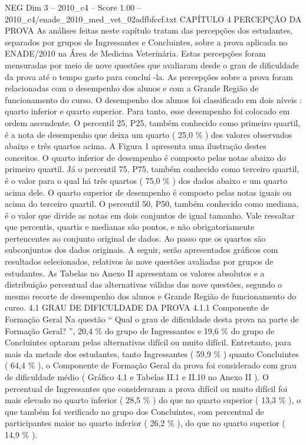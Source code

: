 \begin{textsample}{NEG Dim 3 – 2010\_c4 – Score 1.00 – 2010\_c4/enade\_2010\_med\_vet\_02adfbfccf.txt}  \label{ex:f3_neg_123}
CAPÍTULO 4 PERCEPÇÃO DA PROVA As análises feitas neste capítulo tratam das percepções dos estudantes, separados por grupos de Ingressantes e Concluintes, sobre a prova aplicada no ENADE/2010 na Área de Medicina Veterinária.
Estas percepções foram mensuradas por meio de nove questões que avaliaram desde o grau de dificuldade da prova até o tempo gasto para concluí -la.
As percepções sobre a prova foram relacionadas com o desempenho dos alunos e com a Grande Região de funcionamento do curso.
O desempenho dos alunos foi classificado em dois níveis : quarto inferior e quarto superior.
Para tanto, esse desempenho foi colocado em ordem ascendente.
O percentil 25, P25, também conhecido como primeiro quartil, é a nota de desempenho que deixa um quarto ( 25,0 \% ) dos valores observados abaixo e três quartos acima.
A Figura 1 apresenta uma ilustração destes conceitos.
O quarto inferior de desempenho é composto pelas notas abaixo do primeiro quartil.
Já o percentil 75, P75, também conhecido como terceiro quartil, é o valor para o qual há três quartos ( 75,0 \% ) dos dados abaixo e um quarto acima dele.
O quarto superior de desempenho é composto pelas notas iguais ou acima do terceiro quartil.
O percentil 50, P50, também conhecido como mediana, é o valor que divide as notas em dois conjuntos de igual tamanho.
Vale ressaltar que percentis, quartis e medianas são pontos, e não obrigatoriamente pertencentes ao conjunto original de dados.
Ao passo que os quartos são subconjuntos dos dados originais.
A seguir, serão apresentados gráficos com resultados selecionados, relativos às nove questões avaliadas por grupos de estudantes.
As Tabelas no Anexo II apresentam os valores absolutos e a distribuição percentual das alternativas válidas das nove questões, segundo o mesmo recorte de desempenho dos alunos e Grande Região de funcionamento do curso. 4.1 GRAU DE DIFICULDADE DA PROVA 4.1.1 Componente de Formação Geral Na questão “ Qual o grau de dificuldade desta prova na parte de Formação Geral? ”, 20,4 \% do grupo de Ingressantes e 19,6 \% do grupo de Concluintes optaram pelas alternativas difícil ou muito difícil.
Entretanto, para mais da metade dos estudantes, tanto Ingressantes ( 59,9 \% ) quanto Concluintes ( 64,4 \% ), o Componente de Formação Geral da prova foi considerado com grau de dificuldade médio ( Gráfico 4.1 e Tabelas II.1 e II.10 no Anexo II ).
O percentual de Ingressantes que consideraram a prova difícil ou muito difícil foi mais elevado no quarto inferior ( 28,5 \% ) do que no quarto superior ( 13,3 \% ), o que também foi verificado no grupo dos Concluintes, com percentual de participantes maior no quarto inferior ( 26,2 \% ), do que no quarto superior ( 14,9 \% ).

\end{textsample}
